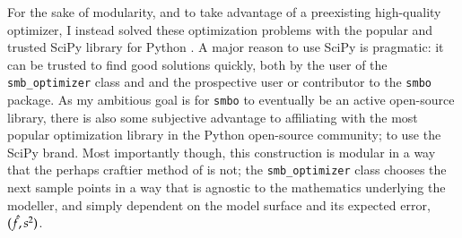 For the sake of modularity, and to take advantage of a preexisting high-quality optimizer, I instead solved these optimization problems with the popular and trusted SciPy library for Python \cite{scipy}. A major reason to use SciPy is pragmatic: it can be trusted to find good solutions quickly, both by the user of the \texttt{smb\_optimizer} class and and the prospective user or contributor to the \texttt{smbo} package. As my ambitious goal is for \texttt{smbo} to eventually be an active open-source library, there is also some subjective advantage to affiliating with the most popular optimization library in the Python open-source community; to use the SciPy brand. Most importantly though, this construction is modular in a way that the perhaps craftier method of \citep{jones_efficient_1998} is not; the \texttt{smb\_optimizer} class chooses the next sample points in a way that is agnostic to the mathematics underlying the modeller, and simply dependent on the model surface and its expected error, $(\hat{f},s^2)$. 

